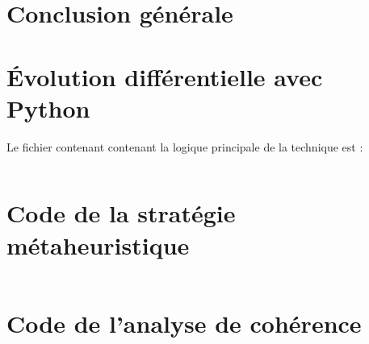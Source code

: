 \chapter*{Conclusion générale}
\label{sec:conc}


\begin{appendices}
  
\chapter{Évolution différentielle avec Python}
  
  Le fichier contenant contenant la logique principale de la technique est :

  \inputminted[mathescape,
               linenos,
               numbersep=5pt,
               frame=lines,
               framesep=2mm,
               breaklines=true,
               fontsize=\scriptsize]{Python}{/home/youssef/PycharmProjects/DEPV/objects.py}
  
\chapter{Code de la stratégie métaheuristique}
  
    \inputminted[mathescape,
               linenos,
               numbersep=5pt,
               frame=lines,
               framesep=2mm,
               breaklines=true,
               fontsize=\scriptsize]{Python}{/home/youssef/PycharmProjects/DEPV/metaheuristic.py}
               
\chapter{Code de l'analyse de cohérence}
\inputminted[mathescape,
               linenos,
               numbersep=5pt,
               frame=lines,
               framesep=2mm,
               breaklines=true,
               fontsize=\scriptsize]{Python}{/home/youssef/PycharmProjects/DEPV/consistency.py}
\inputminted[mathescape,
               linenos,
               numbersep=5pt,
               frame=lines,
               framesep=2mm,
               breaklines=true,
               fontsize=\scriptsize]{Python}{/home/youssef/PycharmProjects/DEPV/metaconsistency.py}
               

\end{appendices}

